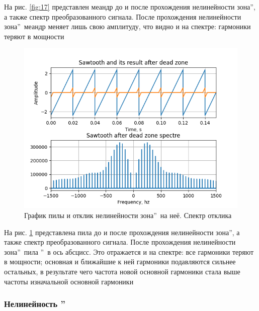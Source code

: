 На рис. \ref{fig:17} представлен меандр до и после прохождения
нелинейности  зона\textquotedblright, а
также спектр преобразованного сигнала. После прохождения
нелинейности  зона\textquotedblright\ 
меандр меняет лишь свою амплитуду, что видно и на спектре:
гармоники теряют в мощности

\begin{figure}[H]
	\centering
	\includegraphics[width=0.75\linewidth]{body/images/sawtooth-after-dead-zone-and-its-spectre.png}
	\caption{График пилы и отклик нелинейности
	 зона\textquotedblright\ на неё. Спектр отклика}
	\label{fig:18}
\end{figure}

На рис. \ref{fig:18} представлена пила до и после прохождения
нелинейности  зона\textquotedblright, а
также спектр преобразованного сигнала. После прохождения
нелинейности  зона\textquotedblright\ 
пила \textquotedblright\ в ось
абсцисс. Это отражается и на спектре: все гармоники теряют
в мощности; основная и ближайшие к ней гармоники подавляются
сильнее остальных, в результате чего частота новой основной
гармоники стала выше частоты изначальной основной гармоники

\subsubsection{Нелинейность \textquotedblright}

